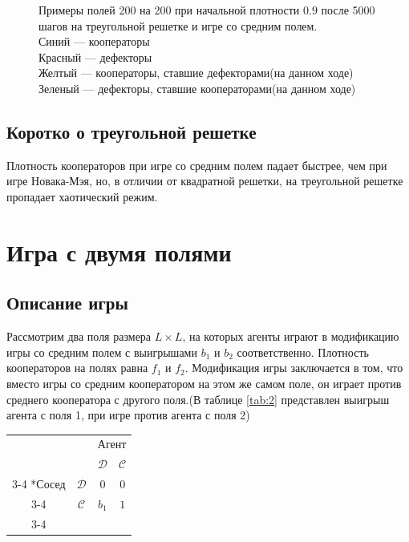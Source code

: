 \documentclass[12pt]{article}
\begin{document}
\begin{figure}[!htbp]
            
            \caption{ Примеры полей 200 на 200 при начальной плотности $0.9$ после 5000 шагов на треугольной решетке и игре со средним полем.\\
            Синий — кооператоры\\
            Красный — дефекторы\\
            Желтый — кооператоры, ставшие дефекторами(на данном ходе)\\
            Зеленый — дефекторы, ставшие кооператорами(на данном ходе)}
            \label{fig:triangfields}
        \end{figure}

    \subsection{Коротко о треугольной решетке}
    Плотность кооператоров при игре со средним полем падает быстрее, чем при игре Новака-Мэя, но, в отличии от квадратной решетки, на треугольной решетке пропадает хаотический режим.
    
\section{Игра с двумя полями}
    \subsection{Описание игры}
        Рассмотрим два поля размера $L\times L$, на которых агенты играют в модификацию игры со средним полем с выигрышами $b_1$ и $b_2$ соответственно. Плотность кооператоров на полях равна $f_1$ и $f_2$. Модификация игры заключается в том, что вместо игры со средним кооператором на этом же самом поле, он играет против среднего кооператора с другого поля.(В таблице \ref{tab:2} представлен выигрыш агента с поля 1, при игре против агента с поля 2)

    
    \begin{minipage}{\linewidth}
        \centering
         \label{tab:1} 
        \setlength{\extrarowheight}{2pt}
        \begin{tabular}{cc|c|c|}
        & \multicolumn{1}{c}{} & \multicolumn{2}{c}{Агент}\\
        & \multicolumn{1}{c}{} & \multicolumn{1}{c}{$\mathcal{D}$}  & \multicolumn{1}{c}{$\mathcal{C}$} \\\cline{3-4}
        \multirow{2}*{Сосед}  & $\mathcal{D}$ & $0$ & $0$ \\\cline{3-4}
        & $\mathcal{C}$ & $b_1$ & $1$ \\\cline{3-4}
        \end{tabular}
        \end{minipage}
        
\end{document}
